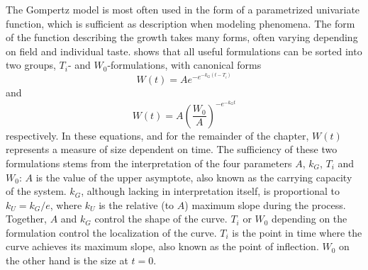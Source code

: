 The Gompertz model is most often used in the form of a parametrized univariate function, which is sufficient as description when modeling phenomena.
The form of the function describing the growth takes many forms, often varying depending on field and individual taste.
\cite{tjorve2017gompertz} shows that all useful formulations can be sorted into two groups, \(T_i\)- and \(W_0\)-formulations, with canonical forms
\begin{equation} \label{eq:gompertz-ti-function}
  W(t) = A e^{-e^{-k_G(t-T_i)}}
\end{equation}
and
\begin{equation} \label{eq:gompertz-w0-function}
  W(t) = A \left(\frac{W_0}{A}\right)^{-e^{-k_G t}}
\end{equation}
respectively.
In these equations, and for the remainder of the chapter, \(W(t)\) represents a measure of size dependent on time.
The sufficiency of these two formulations stems from the interpretation of the four parameters \(A\), \(k_G\), \(T_i\) and \(W_0\):
\(A\) is the value of the upper asymptote, also known as the carrying capacity of the system.
\(k_G\), although lacking in interpretation itself, is proportional to \(k_U = k_G / e\), where \(k_U\) is the relative (to \(A\)) maximum slope during the process.
Together, \(A\) and \(k_G\) control the shape of the curve.
\(T_i\) or \(W_0\) depending on the formulation control the localization of the curve.
\(T_i\) is the point in time where the curve achieves its maximum slope, also known as the point of inflection.
\(W_0\) on the other hand is the size at \(t=0\).

